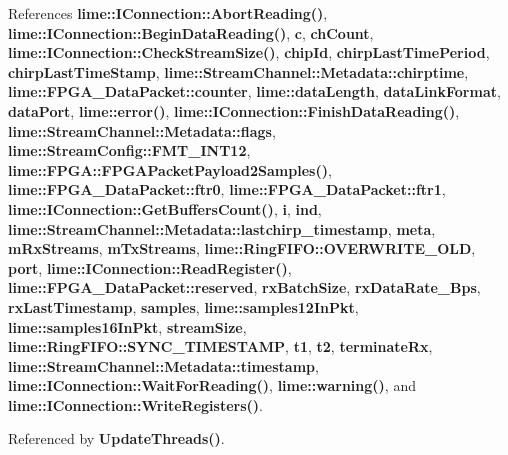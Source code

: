 References {\bf lime\+::\+I\+Connection\+::\+Abort\+Reading()}, {\bf lime\+::\+I\+Connection\+::\+Begin\+Data\+Reading()}, {\bf c}, {\bf ch\+Count}, {\bf lime\+::\+I\+Connection\+::\+Check\+Stream\+Size()}, {\bf chip\+Id}, {\bf chirp\+Last\+Time\+Period}, {\bf chirp\+Last\+Time\+Stamp}, {\bf lime\+::\+Stream\+Channel\+::\+Metadata\+::chirptime}, {\bf lime\+::\+F\+P\+G\+A\+\_\+\+Data\+Packet\+::counter}, {\bf lime\+::data\+Length}, {\bf data\+Link\+Format}, {\bf data\+Port}, {\bf lime\+::error()}, {\bf lime\+::\+I\+Connection\+::\+Finish\+Data\+Reading()}, {\bf lime\+::\+Stream\+Channel\+::\+Metadata\+::flags}, {\bf lime\+::\+Stream\+Config\+::\+F\+M\+T\+\_\+\+I\+N\+T12}, {\bf lime\+::\+F\+P\+G\+A\+::\+F\+P\+G\+A\+Packet\+Payload2\+Samples()}, {\bf lime\+::\+F\+P\+G\+A\+\_\+\+Data\+Packet\+::ftr0}, {\bf lime\+::\+F\+P\+G\+A\+\_\+\+Data\+Packet\+::ftr1}, {\bf lime\+::\+I\+Connection\+::\+Get\+Buffers\+Count()}, {\bf i}, {\bf ind}, {\bf lime\+::\+Stream\+Channel\+::\+Metadata\+::lastchirp\+\_\+timestamp}, {\bf meta}, {\bf m\+Rx\+Streams}, {\bf m\+Tx\+Streams}, {\bf lime\+::\+Ring\+F\+I\+F\+O\+::\+O\+V\+E\+R\+W\+R\+I\+T\+E\+\_\+\+O\+LD}, {\bf port}, {\bf lime\+::\+I\+Connection\+::\+Read\+Register()}, {\bf lime\+::\+F\+P\+G\+A\+\_\+\+Data\+Packet\+::reserved}, {\bf rx\+Batch\+Size}, {\bf rx\+Data\+Rate\+\_\+\+Bps}, {\bf rx\+Last\+Timestamp}, {\bf samples}, {\bf lime\+::samples12\+In\+Pkt}, {\bf lime\+::samples16\+In\+Pkt}, {\bf stream\+Size}, {\bf lime\+::\+Ring\+F\+I\+F\+O\+::\+S\+Y\+N\+C\+\_\+\+T\+I\+M\+E\+S\+T\+A\+MP}, {\bf t1}, {\bf t2}, {\bf terminate\+Rx}, {\bf lime\+::\+Stream\+Channel\+::\+Metadata\+::timestamp}, {\bf lime\+::\+I\+Connection\+::\+Wait\+For\+Reading()}, {\bf lime\+::warning()}, and {\bf lime\+::\+I\+Connection\+::\+Write\+Registers()}.



Referenced by {\bf Update\+Threads()}.



